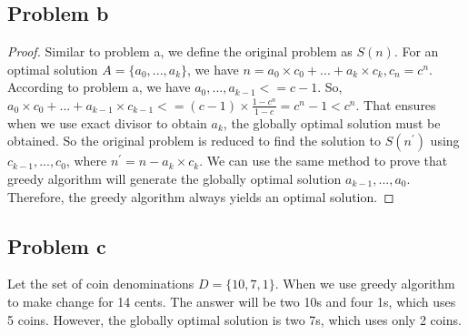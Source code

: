 \documentclass[a4paper]{article}
\newtheorem{proof}{Proof}[section]
\begin{document}
\subsection{Problem b}
\begin{proof}
    Similar to problem a, we define the original problem as $S(n)$. 
    For an optimal solution $A=\{a_0,...,a_k\}$, we have $n = a_0\times c_0+...+a_k\times c_k, c_n = c^{n}$. 
    According to problem a, we have $a_0,...,a_{k-1}<=c-1$. 
    So, $a_0\times c_0+...+a_{k-1}\times c_{k-1}<=(c-1)\times \frac{1-c^{n}}{1-c}=c^{n}-1<c^{n}$.
    That ensures when we use exact divisor to obtain $a_{k}$, the globally optimal solution must be obtained. 
    So the original problem is reduced to find the solution to $S(n^{'})$ using $c_{k-1},...,c_0$, where $n^{'} = n - a_k\times c_k$.
    We can use the same method to prove that greedy algorithm will generate the globally optimal solution $a_{k-1},...,a_0$.
    Therefore, the greedy algorithm always yields an optimal solution.
\end{proof}

\subsection{Problem c}
    Let the set of coin denominations $D = \{10,7,1\}$. 
    When we use greedy algorithm to make change for 14 cents. 
    The answer will be two 10s and four 1s, which uses 5 coins.
    However, the globally optimal solution is two 7s, which uses only 2 coins.
\end{document}
